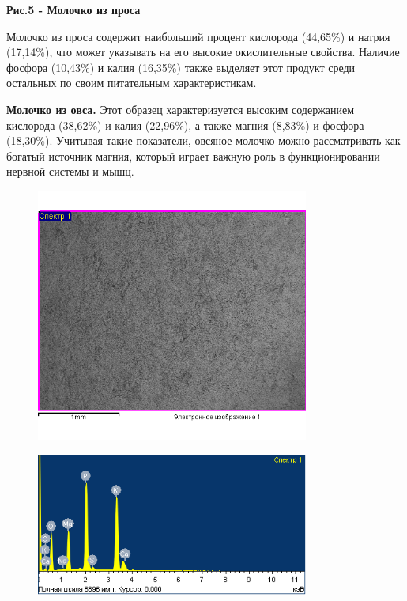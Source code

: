 {\bfseries Рис.5 - Молочко из проса}

Молочко из проса содержит наибольший процент кислорода (44,65\%) и
натрия (17,14\%), что может указывать на его высокие окислительные
свойства. Наличие фосфора (10,43\%) и калия (16,35\%) также выделяет
этот продукт среди остальных по своим питательным характеристикам.

{\bfseries Молочко из овса.} Этот образец характеризуется высоким
содержанием кислорода (38,62\%) и калия (22,96\%), а также магния
(8,83\%) и фосфора (18,30\%). Учитывая такие показатели, овсяное молочко
можно рассматривать как богатый источник магния, который играет важную
роль в функционировании нервной системы и мышц.

\begin{figure}[H]
	\centering
	\includegraphics[width=0.8\textwidth]{media/pish/image55}
	\caption*{}
\end{figure}

\begin{figure}[H]
	\centering
	\includegraphics[width=0.8\textwidth]{media/pish/image56}
	\caption*{}
\end{figure}


